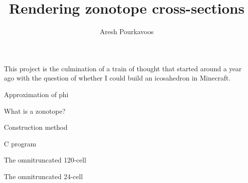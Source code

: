 \documentclass{article}
\begin{document}
\title{Rendering zonotope cross-sections}
\author{Aresh Pourkavoos}
\maketitle

This project is the culmination of a train of thought that started around a year ago
with the question of whether I could build an icosahedron in Minecraft.

Approximation of phi

What is a zonotope?

Construction method

C program

The omnitruncated 120-cell

The omnitruncated 24-cell
\end{document}
